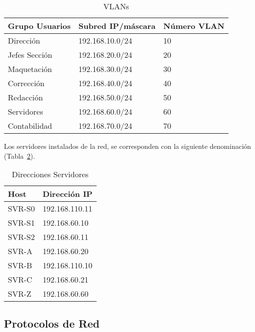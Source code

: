 \documentclass[a4paper,onecolumn,11pt]{article}
\begin{document}
\begin{table}[htbp]
\small \sffamily
\caption{VLANs}
\begin{center}
\begin{tabular}{p{}p{}p{}}
\toprule
\textbf{Grupo Usuarios} &  \textbf{Subred IP/máscara} & \textbf{Número VLAN}\\
\toprule
Dirección & 192.168.10.0/24 & 10 \\ \midrule
Jefes Sección & 192.168.20.0/24  & 20 \\ \midrule
Maquetación & 192.168.30.0/24  & 30 \\ \midrule
Corrección & 192.168.40.0/24  & 40 \\ \midrule
Redacción & 192.168.50.0/24 & 50 \\ \midrule
Servidores & 192.168.60.0/24 & 60 \\ \midrule
Contabilidad & 192.168.70.0/24  & 70 \\
\bottomrule
\end{tabular}
\end{center}
\label{tab:VLANs}
\end{table}

Los servidores instalados de la red, se corresponden con la siguiente denominación (Tabla~\ref{tab:direccionesHosts}).

\begin{table}[htbp]
\small \sffamily
\caption{Direcciones Servidores}
\begin{center}
\begin{tabular}{p{}p{}}
\toprule
\textbf{Host} & \textbf{Dirección IP}\\
\toprule
SVR-S0 &  192.168.110.11\\ \midrule
SVR-S1 &  192.168.60.10\\ \midrule
SVR-S2 & 192.168.60.11 \\ \midrule
SVR-A & 192.168.60.20 \\ \midrule
SVR-B & 192.168.110.10 \\ \midrule
SVR-C & 192.168.60.21 \\ \midrule
SVR-Z & 192.168.60.60\\
\bottomrule
\end{tabular}
\end{center}
\label{tab:direccionesHosts}
\end{table}

\subsection{Protocolos de Red}
\end{document}

